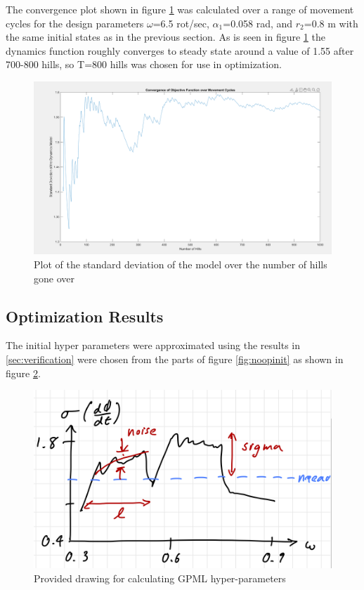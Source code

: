 \documentclass[11pt]{article}%
\begin{document}
The convergence plot shown in figure \ref{fig:conv} was calculated over a range of movement cycles for the design parameters $\omega$=6.5 rot/sec, $\alpha_{1}$=0.058 rad, and $r_{2}$=0.8 m with the same initial states as in the previous section. As is seen in figure \ref{fig:conv} the dynamics function roughly converges to steady state around a value of 1.55 after 700-800 hills, so T=800 hills was chosen for use in optimization.
	\begin{figure}[H]
    \centering
    \includegraphics[width=0.75\linewidth]{convergence.png}
    \caption{ Plot of the standard deviation of the model over the number of hills gone over }
    \label{fig:conv}
\end{figure}
\subsection{Optimization Results}

The initial hyper parameters were approximated using the results in \ref{sec:verification} were chosen from the parts of figure \ref{fig:noopinit} as shown in figure \ref{fig:hyper}.

	\begin{figure}[H]
    \centering
    \includegraphics[width=0.75\linewidth]{hyper.png}
    \caption{ Provided drawing for calculating GPML hyper-parameters \cite{lab3notes}}
   \label{fig:hyper}
\end{figure}
\end{document}
